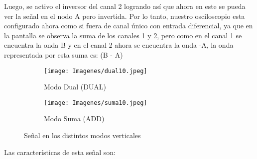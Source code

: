 Luego, se activo el inversor del canal 2 logrando así que ahora en este se pueda ver la señal en el nodo A pero invertida.
Por lo tanto, nuestro osciloscopio esta configurado ahora como si fuera de canal único con entrada diferencial, ya que en la pantalla se observa la suma de los canales 1 y 2, pero como en el canal 1 se encuentra la onda B y en el canal 2 ahora se encuentra la onda -A, la onda representada por esta suma es: (B - A)

\begin{table}[H]
    \centering
        \def\tablename{Tabla} 
        \caption{Cuadro de Controles}
        \label{tab:cont10}
\end{table}


\begin{figure}[H]
    \begin{center}
        \begin{subfigure}[b]{0.5\textwidth}
        \centering  
            \texttt{[image: Imagenes/dual10.jpeg]}
        \caption{Modo Dual (DUAL)}
        \label{fig:dual10}
    \end{subfigure}
    \hfill
    \begin{subfigure}[b]{0.49\textwidth}
        \centering
            \texttt{[image: Imagenes/suma10.jpeg]}
        \caption{Modo Suma (ADD)}
        \label{fig:sum10}
    \end{subfigure}
    \caption{Señal en los distintos modos verticales}
    \label{fig:exp10}
    \end{center}
\end{figure}


Las características de esta señal son:

\begin{table}[H]
    \centering
        \def\tablename{Tabla} 
        \caption{Características del tren de pulsos}
        \label{tab:trenPulsos}
\end{table}



